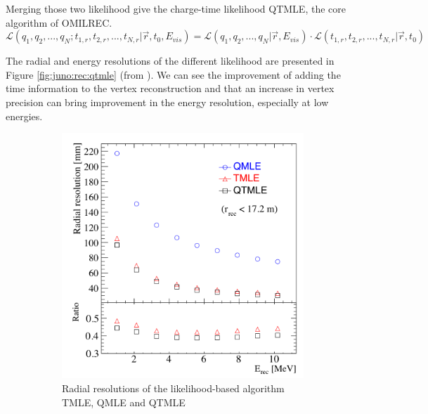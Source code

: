 \documentclass[../main.tex]{subfiles}
\begin{document}
Merging those two likelihood give the charge-time likelihood QTMLE, the core algorithm of OMILREC.
\begin{equation}
  \mathcal{L}(q_1, q_2, ..., q_N; t_{1,r}, t_{2,r}, ..., t_{N,r} | \vec{r}, t_0 , E_{vis}) = \mathcal{L}(q_1, q_2, ..., q_N | \vec{r}, E_{vis}) \cdot \mathcal{L}(t_{1,r}, t_{2,r}, ..., t_{N,r} | \vec{r}, t_0)
\end{equation}

The radial and energy resolutions of the different likelihood are presented in Figure \ref{fig:juno:rec:qtmle} (from \cite{huang_data-driven_2023}). We can see the improvement of adding the time information to the vertex reconstruction and that an increase in vertex precision can bring improvement in the energy resolution, especially at low energies.

\begin{figure}[ht]
  \begin{subfigure}{0.48\linewidth}
    \centering
    \includegraphics[width=\textwidth]{images/juno/reco/radial_qtmle.png}
    \caption{Radial resolutions of the likelihood-based algorithm TMLE, QMLE and QTMLE}
  \end{subfigure}
  \hfill
  \begin{subfigure}{0.48\linewidth}
    \centering

\end{subfigure}
\end{figure}
\end{document}
